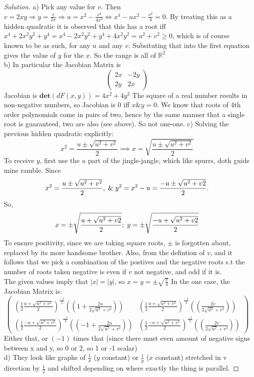 \documentclass{article}
\newcommand{\R}{\mathbb{R}}
\newcommand{\ma}[1]{\mathbf{#1}}
\newenvironment{problem}[2][Problem]{\begin{trivlist}
\item[\hskip \labelsep {\bfseries #1}\hskip \labelsep {\bfseries #2.}]}{\end{trivlist}}
\newenvironment{solution}{\begin{proof}[Solution]}{\end{proof}}
\begin{document}
\begin{problem}{9.18}
\end{problem}
\begin{solution}
    a) Pick any value for $v$. Then $v =2xy \Rightarrow y = \frac{v}{2x} \Rightarrow u = x^2 -\frac{v^2}{4x^2} \iff x^4 -ux^{2} - \frac{v^2}{4} = 0$. By treating this as a hidden quadratic it is observed that this has a root iff $x^4 +2x^{2}y^{2} +y^{4} = x^{4} - 2x^{2}y^{2} + y^{4} +4x^{2}y^{2} = u^2 + v^2 \geq 0$, which is of course known to be as such, for any $u$ and any $v$. Subsituting that into the first equation gives the value of $y$ for the $x$. So the range is all of $\R^2$
  \\
    b) In particular the Jacobian Matrix is 
    \[
    \begin{pmatrix}
        2x & -2y \\
        2y & 2x
    \end{pmatrix}
    \]
    Jacobian is $\ma{det}(dF(x, y)) = 4x^2 +4y^2$  The square of a real number results in non-negative numbers, so Jacobian is 0 iff $x \& y = 0$. We know that roots of 4th order polynomials come in pairs of two, hence by the same manner that a single root is guaranteed, two are also (see above). So not one-one.
    c) Solving the previous hidden quadratic explicitly: 
    \[
    x^{2} = {\frac{u\pm\sqrt{u^{2}+v^{2}}}{2}} \implies x = \sqrt{\frac{u\pm\sqrt{u^{2}+v^{2}}}{2}}
    \]
    To receive $y$, first use the $u$ part of the jingle-jangle, which like spurrs, doth guide mine ramble. Since
    \[
    x^{2} = \frac{u \pm \sqrt{u^{2}+v^{2}}}{2}, \hspace{1mm} \& \hspace{1mm} y^{2} = x^{2} - u = \frac{-u \pm \sqrt{u^{2}+v{2}}}{2}.
     \]
    So, 
    \[
    x = \pm \sqrt{\frac{u + \sqrt{u^{2}+v{2}}}{2}}; \hspace{1mm} y = \pm \sqrt{\frac{-u + \sqrt{u^{2}+v{2}}}{2}}
    \]
    To ensure positivity, since we are taking square roots, $\pm$ is forgotten about, replaced by its more handsome brother. Also, from the defintion of $v$, and it follows that we pick a combination of the postives and the negative roots s.t the number of roots taken negative is even if $v$ not negative, and odd if it is.
    \\
    The given values imply that $|x| = |y|$, so $x = y = \pm \sqrt{\frac{\pi}{3}}$
    In the one case, the Jacobian Matrix is:
    \[
    \begin{pmatrix}
        \left( \frac{1}{2}\frac{u +\sqrt{u^{2} + v^{2}}}{2}\right)^{\frac{-1}{2}}\left((1+\frac{2u}{2\sqrt{u^{2}}+v^{2}})\right)  & \left( \frac{1}{2}\frac{u +\sqrt{u^{2} + v^{2}}}{2}\right)^{\frac{-1}{2}}\left((\frac{2v}{2\sqrt{u^{2}}+v^{2}})\right)\\
        \left( \frac{1}{2}\frac{-u +\sqrt{u^{2} + v^{2}}}{2}\right)^{\frac{-1}{2}}\left((-1+\frac{2u}{2\sqrt{u^{2}}+v^{2}})\right)   &\left( \frac{1}{2}\frac{-u +\sqrt{u^{2} + v^{2}}}{2}\right)^{\frac{-1}{2}}\left((\frac{2v}{2\sqrt{u^{2}}+v^{2}})\right)
    \end{pmatrix}
    \]
    Either that, or $(-1)$ times that (since there must even amount of negative signs between x and y, so 0 or 2, so 1 or -1 scalar)
    \\
    
    d) They look like graphs of $\frac{1}{x}$ ($y$ constant) or $\frac{1}{y}$ ($x$ constant) stretched in v direction by $\frac{1}{2}$ and shifted depending on where exactly the thing is parallel.
\end{solution}
\end{document}
